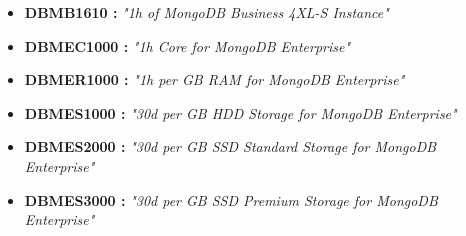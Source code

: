 \begin{itemize}
\begin{itemize}
\begin{itemize}
                        \item \textbf{DBMB1610 : } \textit{"1h of MongoDB Business 4XL-S Instance"}
                        \item \textbf{DBMEC1000 : } \textit{"1h Core for MongoDB Enterprise"}
                        \item \textbf{DBMER1000 : } \textit{"1h per GB RAM for MongoDB Enterprise"}
                        \item \textbf{DBMES1000 : } \textit{"30d per GB HDD Storage for MongoDB Enterprise"}
                        \item \textbf{DBMES2000 : } \textit{"30d per GB SSD Standard Storage for MongoDB Enterprise"}
                        \item \textbf{DBMES3000 : } \textit{"30d per GB SSD Premium Storage for MongoDB Enterprise"}


\end{itemize}
\end{itemize}
\end{itemize}
